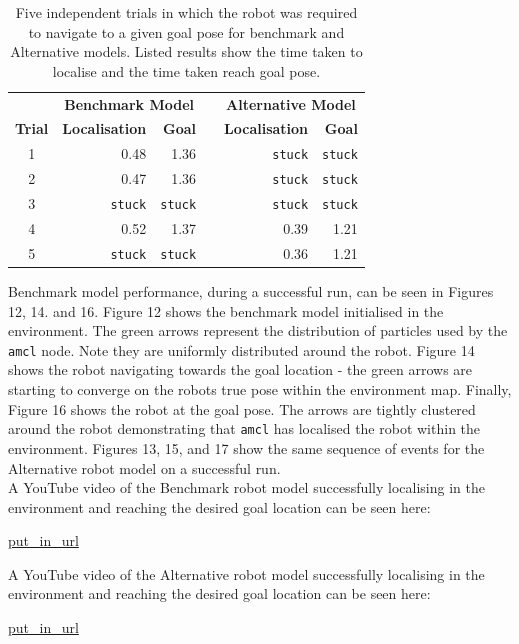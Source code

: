 \documentclass[a4paper]{article}
\begin{document}
\begin{table}[h]
\centering
\caption{Five independent trials in which the robot was required to navigate to a given goal pose for benchmark and Alternative models. Listed results show the time taken to localise and the time taken reach goal pose.}
\begin{tabular}{crrcrr}
\toprule
& \multicolumn{2}{c}{\textbf{Benchmark Model}} & & \multicolumn{2}{c}{\textbf{Alternative Model}} \\
\cline{2-3} \cline{5-6}
\textbf{Trial} & \textbf{Localisation} & \textbf{Goal} & & \textbf{Localisation} & \textbf{Goal} \\
\midrule
1 & 0.48 & 1.36 & & \texttt{stuck} & \texttt{stuck} \\
2 & 0.47 & 1.36 & & \texttt{stuck} & \texttt{stuck} \\
3 & \texttt{stuck} & \texttt{stuck} & & \texttt{stuck} & \texttt{stuck} \\
4 & 0.52 & 1.37 & & 0.39 & 1.21 \\
5 & \texttt{stuck} & \texttt{stuck} & & 0.36 & 1.21 \\
\bottomrule
\end{tabular}
\end{table}

Benchmark model performance, during a successful run, can be seen in Figures 12, 14. and 16. Figure 12 shows the benchmark model initialised in the environment. The green arrows represent the distribution of particles used by the \texttt{amcl} node. Note they are uniformly distributed around the robot. Figure 14 shows the robot navigating towards the goal location - the green arrows are starting to converge on the robots true pose within the environment map. Finally, Figure 16 shows the robot at the goal pose. The arrows are tightly clustered around the robot demonstrating that \texttt{amcl} has localised the robot within the environment. Figures 13, 15, and 17 show the same sequence of events for the Alternative robot model on a successful run.\\

A YouTube video of the Benchmark robot model successfully localising in the environment and reaching the desired goal location can be seen here:
\begin{center}
	\url{put_in_url}
\end{center}

A YouTube video of the Alternative robot model successfully localising in the environment and reaching the desired goal location can be seen here:
\begin{center}
	\url{put_in_url}
\end{center}
\end{document}
